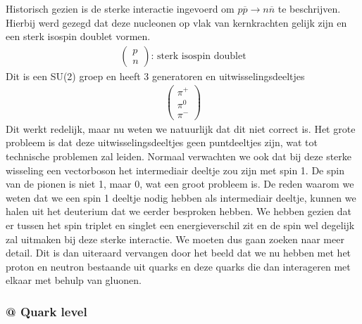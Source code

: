\documentclass[../main.tex]{subfiles}
\begin{document}
Historisch gezien is de sterke interactie ingevoerd om $p\overline p \rightarrow n\overline n$ te beschrijven. Hierbij werd gezegd dat deze nucleonen op vlak van kernkrachten gelijk zijn en een sterk isospin doublet vormen.
\begin{equation}
    \begin{aligned}
        \label{eq:nucleon_doublet}
        \begin{pmatrix}
            p\\
            n
        \end{pmatrix}
        \text{: sterk isospin doublet}
    \end{aligned}
\end{equation}
Dit is een SU(2) groep en heeft 3 generatoren en uitwisselingsdeeltjes
\begin{equation}
    \begin{aligned}
        \label{eq:isospin_uitwisseling_deeltjes}
        \begin{pmatrix}
            \pi^+\\
            \pi^0\\
            \pi^-
        \end{pmatrix}
    \end{aligned}
\end{equation}
Dit werkt redelijk, maar nu weten we natuurlijk dat dit niet correct is. Het grote probleem is dat deze uitwisselingsdeeltjes geen puntdeeltjes zijn, wat tot technische problemen zal leiden. Normaal verwachten we ook dat bij deze sterke wisseling een vectorboson het intermediair deeltje zou zijn met spin 1. De spin van de pionen is niet 1, maar 0, wat een groot probleem is. De reden waarom we weten dat we een spin 1 deeltje nodig hebben als intermediair deeltje, kunnen we halen uit het deuterium dat we eerder besproken hebben. We hebben gezien dat er tussen het spin triplet en singlet een energieverschil zit en de spin wel degelijk zal uitmaken bij deze sterke interactie. We moeten dus gaan zoeken naar meer detail. Dit is dan uiteraard vervangen door het beeld dat we nu hebben met het proton en neutron bestaande uit quarks en deze quarks die dan interageren met elkaar met behulp van gluonen.

\subsubsection{@ Quark level}%
\label{ssub:_quark_level}
\end{document}

